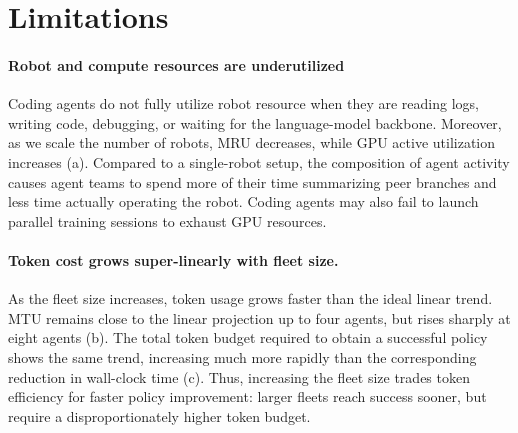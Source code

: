
\section{Limitations}
\paragraph{Robot and compute resources are underutilized}

Coding agents do not fully utilize robot resource when they are reading logs, writing code, debugging, or waiting for the language-model backbone. Moreover, as we scale the number of robots, MRU decreases, while GPU active utilization increases (a). Compared to a single-robot setup, the composition of agent activity causes agent teams to spend more of their time summarizing peer branches and less time actually operating the robot. Coding agents may also fail to launch parallel training sessions to exhaust GPU resources.

\paragraph{Token cost grows super-linearly with fleet size.}
As the fleet size increases, token usage grows faster than the ideal linear trend. MTU remains close to the linear projection up to four agents, but rises sharply at eight agents (b). The total token budget required to obtain a successful policy shows the same trend, increasing much more rapidly than the corresponding reduction in wall-clock time (c). Thus, increasing the fleet size trades token efficiency for faster policy improvement: larger fleets reach success sooner, but require a disproportionately higher token budget.



